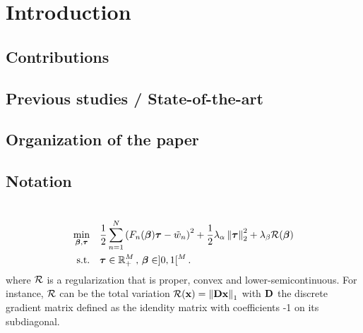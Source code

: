 \section{Introduction}


\subsection{Contributions}


\subsection{Previous studies / State-of-the-art}
\label{ssec:prev_stud}


\subsection{Organization of the paper}


\subsection{Notation}


\section{}


\section{}

\begin{equation}
  \label{eq:optim_pb}
  \begin{aligned}
    \min_{\bbeta,\btau} \quad &
    \frac{1}{2} \sum_{n=1}^{N} {\left(F_{n}(\bbeta)\btau - \tilde{w}_{n}\right)}^{2}
    +\frac{1}{2}\lambda_{\alpha}\norm{\btau}_{2}^{2} + \lambda_{\beta}\mR(\bbeta) \\
    \textrm{s.t.} \quad &
    \btau \in \RR^{M}_{+} \, , \, \bbeta \in ]0,1[^{M} \, .
  \end{aligned}
\end{equation}
where $\mathcal{R}$ is a regularization that is proper, convex and lower-semicontinuous.
For instance, $\mathcal{R}$ can be the total variation $\mathcal{R}(\mathbf{x})=\left\lVert\mathbf{D}\mathbf{x}\right\rVert_{1}$ with
$\mathbf{D}$ the discrete gradient matrix defined as the idendity matrix with
coefficients -1 on its subdiagonal.

